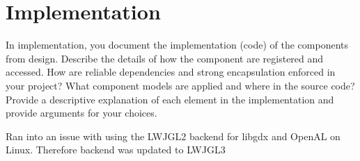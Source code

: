 \section{Implementation}
In implementation, you document the implementation (code) of the components from design.
Describe the details of how the component are registered and accessed.
How are reliable dependencies and strong encapsulation enforced in your project?
What component models are applied and where in the source code?
Provide a descriptive explanation of each element in the implementation and provide arguments for your choices.


Ran into an issue with using the LWJGL2 backend for libgdx and OpenAL on Linux. Therefore backend was updated to LWJGL3